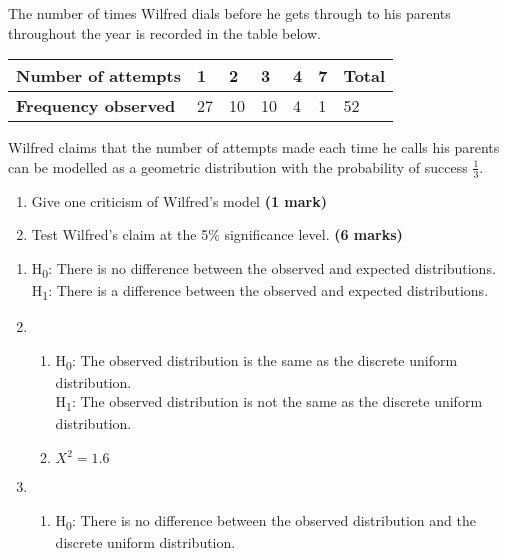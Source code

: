 \documentclass[fleqn]{article}
\begin{document}
\begin{enumerate}
        The number of times Wilfred dials before he gets through to his parents throughout the year is recorded in the table below.\vspace{-1mm}
        \begin{center}
            \begin{tabularx}{0.75\textwidth}{|X|*6{P{12mm}|}}
                \hline
                \textbf{Number of attempts} & 1  & 2  & 3  & 4 & 7 & \textbf{Total}  \\\hline
                \textbf{Frequency observed} & 27 & 10 & 10 & 4 & 1 & 52              \\\hline
            \end{tabularx}
        \end{center}\vspace{3mm}
        Wilfred claims that the number of attempts made each time he calls his parents can be modelled as a geometric distribution with the probability of success $\frac{1}{3}$.
        \begin{enumerate}[label=\bfseries \alph*\space ]
            \item Give one criticism of Wilfred's model \hfill\textbf{(1 mark)}
            \item Test Wilfred's claim at the 5\% significance level. \hfill\textbf{(6 marks)}
        \end{enumerate}
\end{enumerate}





\newpage
{}
\begin{enumerate}
    \setlength\itemsep{0.5em}
    \item H\textsubscript{0}: There is no difference between the observed and expected distributions. \\
        H\textsubscript{1}: There is a difference between the observed and expected distributions.
    \item \begin{enumerate}[label=\bfseries \alph*\space ]
            \item H\textsubscript{0}: The observed distribution is the same as the discrete uniform distribution. \\
                H\textsubscript{1}: The observed distribution is not the same as the discrete uniform distribution.
            \item $X^2=1.6$
        \end{enumerate}
    \item \begin{enumerate}[label=\bfseries \alph*\space ]
            \item H\textsubscript{0}: There is no difference between the observed distribution and the discrete uniform distribution.
        \end{enumerate}
\end{enumerate}
\end{document}
